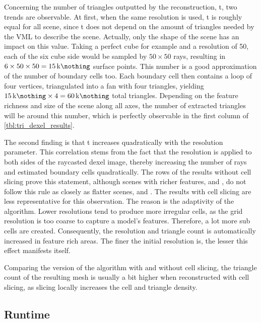 Concerning the number of triangles outputted by the reconstruction, t, two trends are observable.
At first, when the same resolution is used, t is roughly equal for all scene, since t does not depend on the amount of triangles needed by the VML to describe the scene.
Actually, only the shape of the scene has an impact on this value.
Taking a perfect cube for example and a resolution of 50, each of the six cube side would be sampled by $50\times50$ rays, resulting in $6 \times 50 \times 50 = \SI{15}{\kilo\nothing}$ surface points.
This number is a good approximation of the number of boundary cells too.
Each boundary cell then contains a loop of four vertices, triangulated into a fan with four triangles, yielding $\SI{15}{\kilo\nothing} \times 4 = \SI{60}{\kilo\nothing}$ total triangles.
Depending on the feature richness and size of the scene along all axes, the number of extracted triangles will be around this number, which is perfectly observable in the first column of \cref{tbl:tri_dexel_results}.

The second finding is that t increases quadratically with the resolution parameter.
This correlation stems from the fact that the resolution is applied to both sides of the raycasted dexel image, thereby increasing the number of rays and estimated boundary cells quadratically.
The rows of the results without cell slicing prove this statement, although scenes with richer features, \eg \cylinderhead and \impeller, do not follow this rule as closely as flatter scenes, \eg \cubes and \cylinders.
The results with cell slicing are less representative for this observation.
The reason is the adaptivity of the algorithm.
Lower resolutions tend to produce more irregular cells, as the grid resolution is too coarse to capture a model's features.
Therefore, a lot more sub cells are created.
Consequently, the resolution and triangle count is automatically increased in feature rich areas.
The finer the initial resolution is, the lesser this effect manifests itself.

Comparing the version of the algorithm with and without cell slicing, the triangle count of the resulting mesh is usually a bit higher when reconstructed with cell slicing, as slicing locally increases the cell and triangle density.


\subsection{Runtime}
\label{sec:tri_dexel_runtime}

